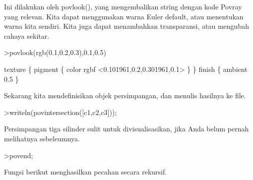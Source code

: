 \documentclass{article}
\begin{document}
\begin{eulernotebook}
\begin{eulercomment}
\begin{eulercomment}
\begin{eulercomment}
Ini dilakukan oleh povlook(), yang mengembalikan string dengan kode
Povray yang relevan. Kita dapat menggunakan warna Euler default, atau
menentukan warna kita sendiri. Kita juga dapat menambahkan
transparansi, atau mengubah cahaya sekitar.
\end{eulercomment}
\begin{eulerprompt}
>povlook(rgb(0.1,0.2,0.3),0.1,0.5)
\end{eulerprompt}
\begin{euleroutput}
   texture \{ pigment \{ color rgbf <0.101961,0.2,0.301961,0.1> \}  \} 
   finish \{ ambient 0.5 \} 
  
\end{euleroutput}
\begin{eulercomment}
Sekarang kita mendefinisikan objek persimpangan, dan menulis hasilnya
ke file.
\end{eulercomment}
\begin{eulerprompt}
>writeln(povintersection([c1,c2,c3]));
\end{eulerprompt}
\begin{eulercomment}
Persimpangan tiga silinder sulit untuk divisualisasikan, jika Anda
belum pernah melihatnya sebeleumnya.
\end{eulercomment}
\begin{eulerprompt}
>povend;
\end{eulerprompt}
\begin{eulercomment}
Fungsi berikut menghasilkan pecahan secara rekursif.


\end{eulercomment}
\end{eulercomment}
\end{eulercomment}
\end{eulernotebook}
\end{document}
